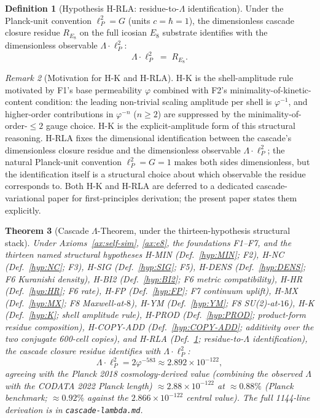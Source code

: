 \documentclass[12pt]{article}
\newtheorem{theorem}{Theorem}
\theoremstyle{definition}
\newtheorem{definition}[theorem]{Definition}
\theoremstyle{remark}
\newtheorem{remark}[theorem]{Remark}
\begin{document}
\begin{definition}[Hypothesis H-RLA: residue-to-$\Lambda$ identification]\label{hyp:RLA}
Under the Planck-unit convention $\ell_P^2 = G$ (units $c = \hbar = 1$), the dimensionless cascade closure residue $R_{E_8}$ on the full icosian $E_8$ substrate identifies with the dimensionless observable $\Lambda \cdot \ell_P^2$:
\begin{equation}
\Lambda \cdot \ell_P^2 \;=\; R_{E_8}.
\end{equation}
\end{definition}

\begin{remark}[Motivation for H-K and H-RLA]\label{rem:HK-HRLA-motivation}
H-K is the shell-amplitude rule motivated by F1's base permeability $\varphi$ combined with F2's minimality-of-kinetic-content condition: the leading non-trivial scaling amplitude per shell is $\varphi^{-1}$, and higher-order contributions in $\varphi^{-n}$ ($n \ge 2$) are suppressed by the minimality-of-order-$\le 2$ gauge choice. H-K is the explicit-amplitude form of this structural reasoning. H-RLA fixes the dimensional identification between the cascade's dimensionless closure residue and the dimensionless observable $\Lambda \cdot \ell_P^2$; the natural Planck-unit convention $\ell_P^2 = G = 1$ makes both sides dimensionless, but the identification itself is a structural choice about which observable the residue corresponds to. Both H-K and H-RLA are deferred to a dedicated cascade-variational paper for first-principles derivation; the present paper states them explicitly.
\end{remark}

\begin{theorem}[Cascade $\Lambda$-Theorem, under the thirteen-hypothesis structural stack]\label{thm:lambda}
Under Axioms~\ref{ax:self-sim}, \ref{ax:e8}, the foundations F1--F7, and the thirteen named structural hypotheses H-MIN (Def.~\ref{hyp:MIN}; F2), H-NC (Def.~\ref{hyp:NC}; F3), H-SIG (Def.~\ref{hyp:SIG}; F5), H-DENS (Def.~\ref{hyp:DENS}; F6 Kuranishi density), H-BI2 (Def.~\ref{hyp:BI2}; F6 metric compatibility), H-HR (Def.~\ref{hyp:HR}; F6 rate), H-FP (Def.~\ref{hyp:FP}; F7 continuum uplift), H-MX (Def.~\ref{hyp:MX}; F8 Maxwell-at-$8$), H-YM (Def.~\ref{hyp:YM}; F8 SU(2)-at-$16$), H-K (Def.~\ref{hyp:K}; shell amplitude rule), H-PROD (Def.~\ref{hyp:PROD}; product-form residue composition), H-COPY-ADD (Def.~\ref{hyp:COPY-ADD}; additivity over the two conjugate 600-cell copies), and H-RLA (Def.~\ref{hyp:RLA}; residue-to-$\Lambda$ identification), the cascade closure residue identifies with $\Lambda \cdot \ell_P^2$:
\begin{equation}\label{eq:lambda-result}
\Lambda \cdot \ell_P^2 = 2 \varphi^{-583} \approx 2.892 \times 10^{-122},
\end{equation}
agreeing with the Planck 2018 cosmology-derived value (combining the observed $\Lambda$ with the CODATA 2022 Planck length) $\approx 2.88 \times 10^{-122}$ at $\approx 0.88\%$ (Planck benchmark; $\approx 0.92\%$ against the $2.866 \times 10^{-122}$ central value). The full 1144-line derivation is in \texttt{cascade-lambda.md}.
\end{theorem}
\end{document}
